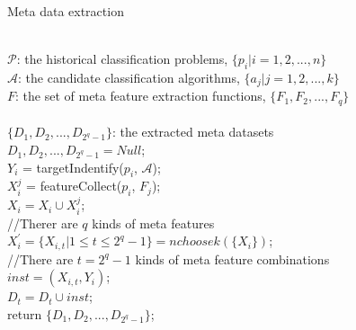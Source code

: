 \documentclass[review,3p,twocolumn,times]{elsarticle}
\begin{document}
\begin{algorithm}[!h]
    \footnotesize
	\caption{Meta data extraction}
	\label{pro:Meta data}
	\begin{algorithmic}[1]
		
		\REQUIRE ~~\\
		$\mathcal{P}$: the historical classification problems, $\{p_i|i=1, 2, ..., n\}$ \\
		$\mathcal{A}$: the candidate classification algorithms, $\{a_j|j=1, 2, ..., k\}$ \\
		$F$: the set of meta feature extraction functions, $\{F_1, F_2, ..., F_q\}$\\ 
		\ENSURE ~~\\
		$\{D_1,D_2, ..., D_{2^q-1}\}$: the extracted meta datasets\\
		\STATE $D_1,D_2, ..., D_{2^q-1} = Null$;\\
		\STATE $Y_i$ = targetIndentify($p_i$, $\mathcal{A}$);\\
		\STATE $X_i^j$ = featureCollect($p_i$, $F_j$);\\
		\STATE $X_i = X_i \cup X_i^j$;\\
		\ENDFOR
		\quad\scriptsize{//Therer are $q$ kinds of meta features}\\
		\STATE $X_i^{'} = \{X_{i,t} | 1 \leq t \leq 2^q - 1\} = nchoosek(\{X_i\})$;\\
		\quad\scriptsize{//There are $t = 2^q-1$ kinds of meta feature combinations}\\
		\STATE $inst = (X_{i,t}, Y_i)$;\\
		\STATE $D_t = D_t \cup {inst}$;\\
		\ENDFOR
		\ENDFOR
		\STATE return $\{D_1,D_2, ..., D_{2^q-1}\}$;\\
	\end{algorithmic}
\end{algorithm}
\end{document}
